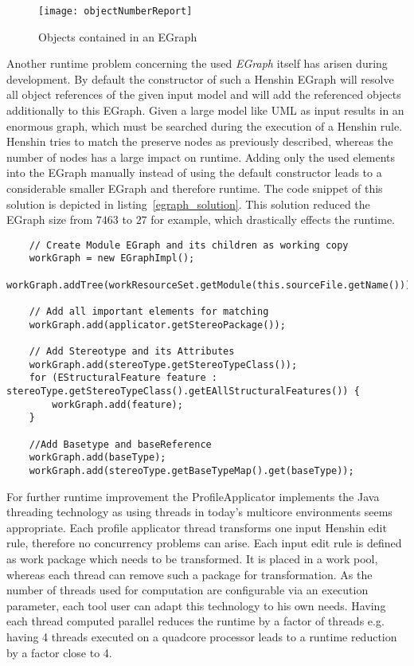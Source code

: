  \begin{figure}[h!]
\begin{center}
\texttt{[image: objectNumberReport]}\\
\end{center}
\caption{Objects contained in an EGraph}
\label{objectNumberReport}
\end{figure}

Another runtime problem concerning the used \textit{EGraph} itself has arisen
during development. By default the constructor of such a Henshin EGraph will resolve
all object references of the given input model and will add the referenced
objects additionally to this EGraph. Given a large model like \ac{UML} as
input results in an enormous graph, which must be searched during the execution
of a Henshin rule. Henshin tries to match the preserve nodes as previously
described, whereas the number of nodes has a large impact on runtime. Adding
only the used elements into the EGraph manually instead of using the default
constructor leads to a considerable smaller EGraph and therefore runtime.
The code snippet of this solution is depicted in listing~\ref{egraph_solution}.
This solution reduced the EGraph size from $7463$ to $27$ for example, which
drastically effects the runtime.

    \begin{lstlisting}
 	// Create Module EGraph and its children as working copy
	workGraph = new EGraphImpl();
	workGraph.addTree(workResourceSet.getModule(this.sourceFile.getName()));

	// Add all important elements for matching
	workGraph.add(applicator.getStereoPackage());

	// Add Stereotype and its Attributes
	workGraph.add(stereoType.getStereoTypeClass());
	for (EStructuralFeature feature : stereoType.getStereoTypeClass().getEAllStructuralFeatures()) {
		workGraph.add(feature);
	}
	
	//Add Basetype and baseReference
	workGraph.add(baseType);
	workGraph.add(stereoType.getBaseTypeMap().get(baseType));\end{lstlisting}

For further runtime improvement the ProfileApplicator implements the Java
threading technology as using threads in today's multicore environments seems
appropriate. Each profile applicator thread transforms one input Henshin edit
rule, therefore no concurrency problems can arise. Each input edit rule is
defined as work package which needs to be transformed. It is placed in a work pool, whereas each
thread can remove such a package for transformation. As the number of
threads used for computation are configurable via an execution parameter, 
each tool user can adapt this technology to his own needs. Having each thread
computed parallel reduces the runtime by a factor of threads e.g. having 4 threads 
executed on a quadcore processor leads to a runtime reduction by a factor close
to 4.

